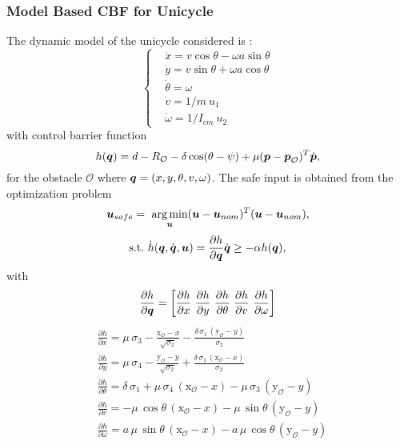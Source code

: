 \subsubsection*{Model Based CBF for Unicycle}
The dynamic model of the unicycle considered is : 
\begin{equation}
\left\{ \begin{aligned}
    &\dot{x}      = v\cos\theta -\omega a\sin\theta \\
    &\dot{y}      =  v\sin\theta +\omega a\cos\theta \\
    &\dot{\theta} =  \omega \\
    &\dot{v}      =   1/m~u_1 \\
    &\dot{\omega}   = 1/I_{cm}~u_2 
\end{aligned} \right.
\end{equation}
with control barrier function
\begin{equation*}
    h({\boldsymbol{q}}) = d-R_{\mathcal{O}}-\delta \cos(\theta - \psi)+\mu(\boldsymbol{p}-\boldsymbol{p}_\mathcal{O})^T\dot{\boldsymbol{p}},
\end{equation*}
for the obstacle $\mathcal{O}$ where ${\boldsymbol{q}}=(x,y,\theta,v,\omega)$. The safe input is obtained from the optimization problem
\begin{equation*}
    \boldsymbol{u}_{safe}=~\underset{\boldsymbol{u}}{\arg\min}(\boldsymbol{u}-\boldsymbol{u}_{nom})^T(\boldsymbol{u}-\boldsymbol{u}_{nom}),
\end{equation*}
\begin{equation*}
    \mathrm{s.t.}\,\, \dot{h}({\boldsymbol{q}},\dot{\boldsymbol{q}},\boldsymbol{u})= \frac{\partial{h}}{\partial {\boldsymbol{q}}}\dot{\boldsymbol{q}} \geq -\alpha h({\boldsymbol{q}}),
\end{equation*}
with
\begin{equation*}
\frac{\partial{h}}{\partial {\boldsymbol{q}}} = \left[ \frac{\partial{h}}{\partial{x}}\,\, \frac{\partial{h}}{\partial{y}} \,\, \frac{\partial{h}}{\partial{\theta}}\,\, \frac{\partial{h}}{\partial{v}} \,\, \frac{\partial{h}}{\partial{\omega}}  \right]
\end{equation*}
\begin{align*}
   & \frac{\partial{h}}{\partial{x}} =\mu \,\sigma_3 -\frac{\mathrm{x_\mathcal{O}}-x}{\sqrt{\sigma_2 }}-\frac{\delta \,\sigma_1 \,{\left(\mathrm{y_\mathcal{O}}-y\right)}}{\sigma_2 }\\
  &  \frac{\partial{h}}{\partial{y}} = \mu \,\sigma_4 -\frac{\mathrm{y_\mathcal{O}}-y}{\sqrt{\sigma_2 }}+\frac{\delta \,\sigma_1 \,{\left(\mathrm{x_\mathcal{O}}-x\right)}}{\sigma_2 } 
\\
  &  \frac{\partial{h}}{\partial{\theta}} = \delta \,\sigma_1 +\mu \,\sigma_4 \,{\left(\mathrm{x_\mathcal{O}}-x\right)}-\mu \,\sigma_3 \,{\left(\mathrm{y_\mathcal{O}}-y\right)} \\
  &  \frac{\partial{h}}{\partial{v}} =  -\mu \,\cos \theta\,{\left(\mathrm{x_\mathcal{O}}-x\right)}-\mu \,\sin \theta\,{\left(\mathrm{y_\mathcal{O}}-y\right)} 
\\
    &\frac{\partial{h}}{\partial{\omega}} = a\,\mu \,\sin \theta\,{\left(\mathrm{x_\mathcal{O}}-x\right)}-a\,\mu \,\cos \theta\,{\left(\mathrm{y_\mathcal{O}}-y\right)}
\end{align*}
